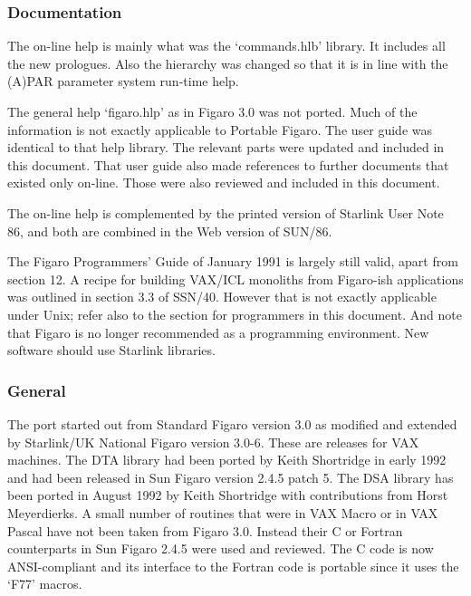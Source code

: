 \documentclass[11pt,twoside]{article}
\newcommand{\htmlref}[2]{#1}
\begin{document}

\subsubsection{\label{changessub1}Documentation}

   The on-line help is mainly what was the `commands.hlb' library. It
   includes all the new prologues. Also
   the hierarchy was changed so that it is in line with the (A)PAR
   parameter system run-time help.

   The general help `figaro.hlp' as in Figaro 3.0 was not ported. Much
   of the information is not exactly applicable to Portable Figaro. The
   user guide was identical to that help library. The relevant parts
   were updated and included in this document. That user guide also made
   references to further documents that existed only on-line. Those were
   also reviewed and included in this document.

   The on-line help is complemented by the printed version of Starlink
   User Note 86, and both are combined in the Web version of SUN/86.

   The Figaro Programmers' Guide of January 1991 is largely still
   valid, apart from section 12. A recipe for building VAX/ICL monoliths from
   Figaro-ish applications was outlined in section 3.3 of SSN/40.
   However that is not exactly applicable under Unix; refer also to
   the \htmlref{section for programmers}{proghint} in this document. And
   note that Figaro is no longer recommended as a programming
   environment. New software should use Starlink libraries.


\subsubsection{\label{changessub2}General}

   The port started out from Standard Figaro version 3.0 as modified and
   extended by Starlink/UK National Figaro version 3.0-6. These are
   releases for VAX machines. The DTA library had been ported by Keith
   Shortridge in early 1992 and had been released in Sun Figaro version
   2.4.5 patch 5. The DSA library has been ported in August 1992 by
   Keith Shortridge with contributions from Horst Meyerdierks. A small
   number of routines that were in VAX Macro or in VAX Pascal have not
   been taken from Figaro 3.0. Instead their C or Fortran counterparts
   in Sun Figaro 2.4.5 were used and reviewed. The C code is now
   ANSI-compliant and its interface to the Fortran code is portable
   since it uses the `F77' macros.
\end{document}

